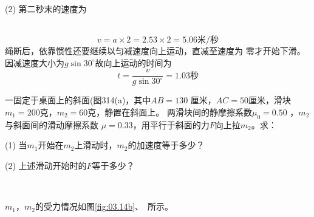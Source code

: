 (2) 第二秒末的速度为

~\vspace{-1.56em}
\begin{equation*}
	v = a \times 2 = 2 . 5 3 \times 2 = 5 . 0 6 \text{米/秒}
\end{equation*}
绳断后，依靠惯性还要继续以匀减速度向上运动，直减至速度为
零才开始下滑。因减速度大小为$  g \sin 3 0 ^ { \circ } $故向上运动的时间为
\begin{equation*}
	t = \frac { v } { g \sin 3 0 ^ { \circ } } = 1 . 0 3\text{秒}
\end{equation*}

\example 一固定于桌面上的斜面(图314(a)，其中$  A B = 1 3 0  $
厘米，$  A C = 5 0  $厘米，滑块$  m _ { 1 } = 2 0 0  $克，$  m _ { 2 } = 6 0  $克，静置在斜面上。
两滑块间的静摩擦系数$  \mu _ { 0 } = 0 . 5 0 $ ，$m_2$与斜面间的滑动摩擦系数
$ \mu = 0 . 3 3  $，用平行于斜面的力$ F $向上拉$m_2$。求：

(1) 当$m_1$开始在$m_2$上滑动时，$m_2$的加速度等于多少？

(2) 上述滑动开始时的$ F $等于多少？
\begin{figurex}
	\centering
	\\[-0.5em]
	 \qquad
	\caption{}
	\label{fig:03.14}
\end{figurex}

\solution $m_1$，$m_2$的受力情况如图\ref{fig:03.14b}、~所示。


